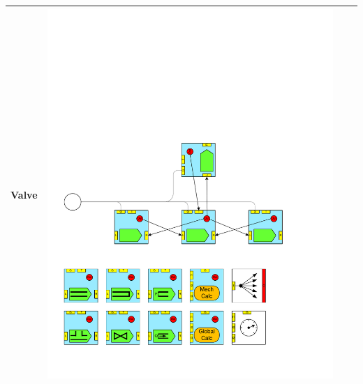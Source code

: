 \begin{table}
\begin{center}
\begin{tabular}{|p{2cm}|c|p{2cm}|c|}
Valve 			&\includegraphics[page=16, scale=0.25]{./figs/1dcfd/ElementalProcessors.pdf} \\ \hline

\end{tabular}
\end{center}
\end{table}
